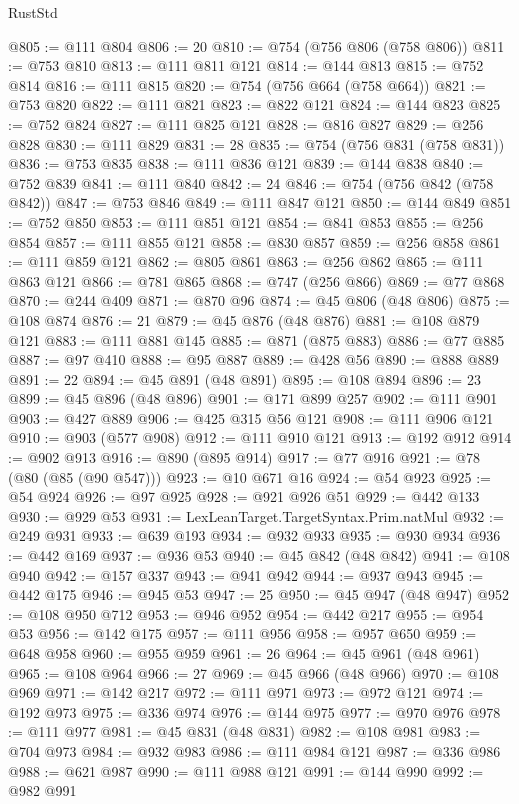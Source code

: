 \begin{lexlean}{RustStd}
\begin{coremodule}
@805 := @111 @804
@806 := 20
@810 := @754 (@756 @806 (@758 @806))
@811 := @753 @810
@813 := @111 @811 @121
@814 := @144 @813
@815 := @752 @814
@816 := @111 @815
@820 := @754 (@756 @664 (@758 @664))
@821 := @753 @820
@822 := @111 @821
@823 := @822 @121
@824 := @144 @823
@825 := @752 @824
@827 := @111 @825 @121
@828 := @816 @827
@829 := @256 @828
@830 := @111 @829
@831 := 28
@835 := @754 (@756 @831 (@758 @831))
@836 := @753 @835
@838 := @111 @836 @121
@839 := @144 @838
@840 := @752 @839
@841 := @111 @840
@842 := 24
@846 := @754 (@756 @842 (@758 @842))
@847 := @753 @846
@849 := @111 @847 @121
@850 := @144 @849
@851 := @752 @850
@853 := @111 @851 @121
@854 := @841 @853
@855 := @256 @854
@857 := @111 @855 @121
@858 := @830 @857
@859 := @256 @858
@861 := @111 @859 @121
@862 := @805 @861
@863 := @256 @862
@865 := @111 @863 @121
@866 := @781 @865
@868 := @747 (@256 @866)
@869 := @77 @868
@870 := @244 @409
@871 := @870 @96
@874 := @45 @806 (@48 @806)
@875 := @108 @874
@876 := 21
@879 := @45 @876 (@48 @876)
@881 := @108 @879 @121
@883 := @111 @881 @145
@885 := @871 (@875 @883)
@886 := @77 @885
@887 := @97 @410
@888 := @95 @887
@889 := @428 @56
@890 := @888 @889
@891 := 22
@894 := @45 @891 (@48 @891)
@895 := @108 @894
@896 := 23
@899 := @45 @896 (@48 @896)
@901 := @171 @899 @257
@902 := @111 @901
@903 := @427 @889
@906 := @425 @315 @56 @121
@908 := @111 @906 @121
@910 := @903 (@577 @908)
@912 := @111 @910 @121
@913 := @192 @912
@914 := @902 @913
@916 := @890 (@895 @914)
@917 := @77 @916
@921 := @78 (@80 (@85 (@90 @547)))
@923 := @10 @671 @16
@924 := @54 @923
@925 := @54 @924
@926 := @97 @925
@928 := @921 @926 @51
@929 := @442 @133
@930 := @929 @53
@931 := LexLeanTarget.TargetSyntax.Prim.natMul
@932 := @249 @931
@933 := @639 @193
@934 := @932 @933
@935 := @930 @934
@936 := @442 @169
@937 := @936 @53
@940 := @45 @842 (@48 @842)
@941 := @108 @940
@942 := @157 @337
@943 := @941 @942
@944 := @937 @943
@945 := @442 @175
@946 := @945 @53
@947 := 25
@950 := @45 @947 (@48 @947)
@952 := @108 @950 @712
@953 := @946 @952
@954 := @442 @217
@955 := @954 @53
@956 := @142 @175
@957 := @111 @956
@958 := @957 @650
@959 := @648 @958
@960 := @955 @959
@961 := 26
@964 := @45 @961 (@48 @961)
@965 := @108 @964
@966 := 27
@969 := @45 @966 (@48 @966)
@970 := @108 @969
@971 := @142 @217
@972 := @111 @971
@973 := @972 @121
@974 := @192 @973
@975 := @336 @974
@976 := @144 @975
@977 := @970 @976
@978 := @111 @977
@981 := @45 @831 (@48 @831)
@982 := @108 @981
@983 := @704 @973
@984 := @932 @983
@986 := @111 @984 @121
@987 := @336 @986
@988 := @621 @987
@990 := @111 @988 @121
@991 := @144 @990
@992 := @982 @991

\end{coremodule}
\end{lexlean}
